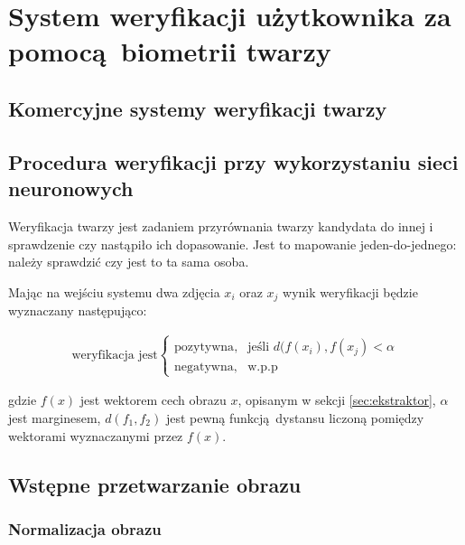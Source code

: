 

\section[verification]{System weryfikacji użytkownika za pomocą biometrii twarzy}\label{sec:verification}
\subsection{Komercyjne systemy weryfikacji twarzy}

\subsection{Procedura weryfikacji przy wykorzystaniu sieci neuronowych} 

Weryfikacja twarzy jest zadaniem przyrównania twarzy kandydata 
do innej i sprawdzenie czy nastąpiło ich dopasowanie. Jest to mapowanie
jeden-do-jednego: należy sprawdzić czy jest to ta sama osoba.

Mając na wejściu systemu dwa zdjęcia \(x_i\) oraz \(x_j\) wynik weryfikacji będzie wyznaczany następująco:

\begin{align}\label{eq:ekstraktor_weryfikacja}
\text{weryfikacja jest}\begin{cases}
    \text{pozytywna},& \text{jeśli } d(f(x_i), f(x_j) < \alpha \\
    \text{negatywna},              & \text{w.p.p}
\end{cases}
\end{align}

gdzie \(f(x)\) jest wektorem cech obrazu \(x\), opisanym w sekcji
\ref{sec:ekstraktor}, \(\alpha\) jest marginesem, \(d(f_1, f_2)\) jest pewną funkcją dystansu liczoną pomiędzy wektorami wyznaczanymi przez \(f(x)\).

\subsection{Wstępne przetwarzanie obrazu}
\subsubsection{Normalizacja obrazu}

